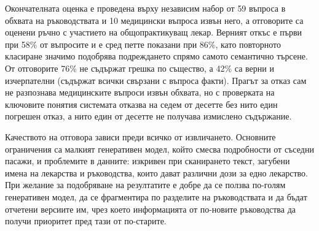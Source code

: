 \documentclass[12pt,a4paper]{article}
\begin{document}
Окончателната оценка е проведена върху независим набор от 59 въпроса в обхвата на ръководствата и 10 медицински въпроса извън него, а отговорите са оценени ръчно с участието на общопрактикуващ лекар. Верният откъс е първи при 58\% от въпросите и е сред петте показани при 86\%, като повторното класиране значимо подобрява подреждането спрямо самото семантично търсене. От отговорите 76\% не съдържат грешка по същество, а 42\% са верни и изчерпателни (съдържат всички свързани с въпроса факти). Прагът за отказ сам не разпознава медицинските въпроси извън обхвата, но с проверката на ключовите понятия системата отказва на седем от десетте без нито един погрешен отказ, а нито един от десетте не получава измислено съдържание.

Качеството на отговора зависи преди всичко от извличането. Основните ограничения са малкият генеративен модел, който смесва подробности от съседни пасажи, и проблемите в данните: изкривен при сканирането текст, загубени имена на лекарства и ръководства, които дават различни дози за едно лекарство. При желание за подобряване на резултатите е добре да се ползва по-голям генеративен модел, да се фрагментира по разделите на ръководствата и да бъдат отчетени версиите им, чрез което информацията от по-новите ръководства да получи приоритет пред тази от по-старите.
\end{document}
